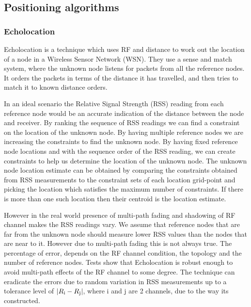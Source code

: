 
\subsection{Positioning algorithms} \label{posiitoning_alg}


\subsubsection{Echolocation} \label{ecolocation}

Echolocation\cite{Ecolocation} is a technique which uses RF and distance
to work out the location of a node in a Wireless Sensor Network (WSN).
They use a sense and match system, where the unknown node listens for
packets from all the reference nodes. It orders the packets in terms of the distance it has travelled, and then tries to match it to known distance
orders. 

In an ideal scenario the Relative Signal Strength (RSS) reading from
each reference node would be an accurate indication of the distance
between the node and receiver. By ranking the sequence of RSS readings we can
find a constraint on the location of the unknown node. By having multiple
reference nodes we are increasing the constraints to find the unknown
node. By having fixed reference node locations and with the sequence order
of the RSS reading, we can create constraints to help us determine the location of the unknown
node. The unknown node location estimate can be obtained
by comparing the constraints obtained from RSS measurements to the
constraint sets of each location grid-point and picking the location
which satisfies the maximum number of constraints. If there is more
than one such location then their centroid is the location estimate.

However in the real world presence of multi-path fading and shadowing
of RF channel makes the RSS readings vary. We assume
that reference nodes that are far from the unknown node should measure
lower RSS values than the nodes that are near to it. However due to
multi-path fading this is not always true. The percentage of error,
depends on the RF channel condition, the topology and the number
of reference nodes. Tests show that Echolocation is robust enough to avoid multi-path
effects of the RF channel to some degree\cite{Ecolocation}. The technique can eradicate
the errors due to random variation in RSS measurements up to a tolerance
level of $|R \textsubscript{i}-R \textsubscript{j}| $, where i and j are 2 channels,
due to the way
its constructed.

